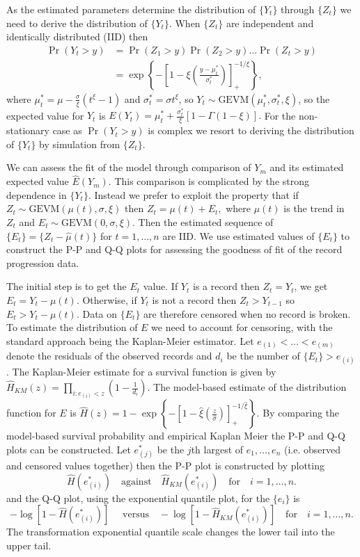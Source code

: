 \documentclass[10pt]{article}
\begin{document}
As the estimated parameters determine the distribution of $\{Y_t\}$
through $\{Z_t\}$ we need to derive the distribution of
$\{Y_t\}$. When $\{Z_t\}$ are independent and identically distributed
(IID) then 
\begin{align}
\Pr( Y_t > y )  & =  \Pr(Z_1 > y)\Pr(Z_2 > y) \ldots \Pr(Z_t > y) \nonumber \\
 & =  \exp\left\{
   -\left[1-\xi\left(\frac{y-\mu^*_t}{\sigma^*_t}\right)\right]
^{-1/\xi}_+\right\},  
\end{align}
where $\mu^*_t = \mu - \frac{\sigma}{\xi}(t^\xi-1)$ and $\sigma^*_t =
\sigma t^\xi$, so $Y_t \sim \mbox{GEVM}(\mu^*_t,\sigma^*_t,\xi)$, so
the expected value for $Y_t$ is $E(Y_t) = \mu^*_t + \frac{\sigma^*_t}{\xi}[1 - 
\Gamma(1-\xi)].$  For the non-stationary case as $\Pr(Y_t>y)$ is
complex we resort to deriving the distribution of $\{Y_t\}$ by
simulation from $\{Z_t\}$. 

We can assess the fit of the model through comparison of $Y_m$ and its
estimated expected value $\hat{E}(Y_m)$. This comparison is
complicated by the strong dependence in $\{Y_t\}$. Instead we prefer
to exploit the property that if $Z_t \sim \mbox{GEVM}(\mu(t),\sigma,\xi)$ then
$Z_t = \mu(t) + E_t,$ where $\mu(t)$ is the trend in $Z_t$ and $E_t
\sim \mbox{GEVM}(0,\sigma,\xi)$. Then the estimated sequence of
$\{E_t\}=\{Z_t-\hat{\mu}(t)\}$ for $t=1,\dots,n$ are IID. We use
estimated values of $\{E_t\}$ to construct the
P-P and Q-Q plots for assessing the goodness of fit of the record
progression data. 

The initial step is to get the $E_t$ value. 
If $Y_t$ is a record then $Z_t =Y_t$, we get $E_t = Y_t -
\mu(t)$. Otherwise, if $Y_t$ is not a record 
then $Z_t > Y_{t-1}$ so $E_t > Y_t - \mu(t)$.  
Data on $\{E_t\}$ are therefore censored when no record is broken. To
estimate the distribution of $E$ we need to account for censoring,
with the standard approach being the Kaplan-Meier estimator. Let
$e_{(1)}<\ldots<e_{(m)}$ denote the residuals of the observed records 
and $d_i$ be the number of $\{E_t\}>e_{(i)}$.
The Kaplan-Meier estimate for a survival function is given by
$\hat{H}_{KM}\left(z\right)=\prod_{i:e_{(i)}<z} \left(1 -
\frac{1}{d_i}\right)$.
The model-based
estimate of the distribution function for $E$ is $ 
\hat{H}(z) =1- \exp  \left\{ -\left [ 1-\hat{\xi} \left(
      \frac{z}{\hat{\sigma}} \right) \right ]^{-1/\hat{\xi}}_+ 
\right \}.
$
By comparing the model-based survival probability and empirical Kaplan Meier the P-P and Q-Q plots can be constructed. 
Let $e^{*}_{(j)}$ be the
$j$th largest of $e_1,\ldots,e_n$ (i.e. observed and censored values
together) then the P-P plot is constructed by plotting 
\[\hat{H}(e^{*}_{(i)}) \quad \mbox{against} \quad \hat{H}_{KM}(e^{*}_{(i)}) \quad \mbox{for} \quad i=1,\ldots,n. \]
and the Q-Q plot, using the exponential quantile plot, for the $\{e_i\}$ is
\[ -\log \left[1-\hat{H}(e^{*}_{(i)})\right] \quad \mbox{ versus}\quad
-\log\left[1-\hat{H}_{KM}(e^{*}_{(i)})\right] \quad \mbox{for} \quad
 i=1,\ldots,n .\]  
The transformation exponential quantile scale changes the lower tail
 into the upper tail.
\end{document}
